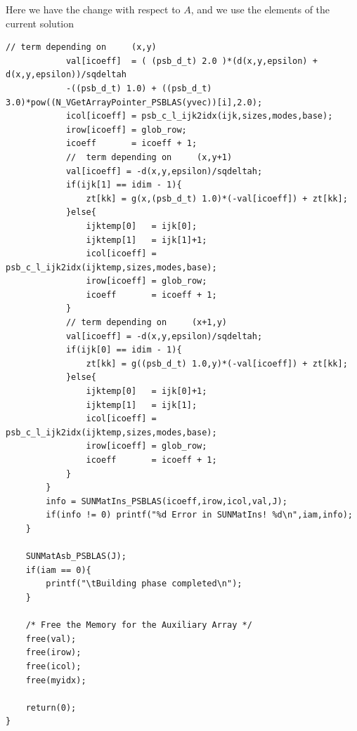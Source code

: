 \documentclass[twoside,a4paper]{refart}
\theoremstyle{definition}
\begin{document}
Here we have the change with respect to $A$, and we use the elements of the current solution
\begin{lstlisting}[style=CStyle]
			// term depending on     (x,y)
			val[icoeff]  = ( (psb_d_t) 2.0 )*(d(x,y,epsilon) + d(x,y,epsilon))/sqdeltah
			-((psb_d_t) 1.0) + ((psb_d_t) 3.0)*pow((N_VGetArrayPointer_PSBLAS(yvec))[i],2.0);
			icol[icoeff] = psb_c_l_ijk2idx(ijk,sizes,modes,base);
			irow[icoeff] = glob_row;
			icoeff       = icoeff + 1;
			//  term depending on     (x,y+1)
			val[icoeff] = -d(x,y,epsilon)/sqdeltah;
			if(ijk[1] == idim - 1){
				zt[kk] = g(x,(psb_d_t) 1.0)*(-val[icoeff]) + zt[kk];
			}else{
				ijktemp[0]   = ijk[0];
				ijktemp[1]   = ijk[1]+1;
				icol[icoeff] = psb_c_l_ijk2idx(ijktemp,sizes,modes,base);
				irow[icoeff] = glob_row;
				icoeff       = icoeff + 1;
			}
			// term depending on     (x+1,y)
			val[icoeff] = -d(x,y,epsilon)/sqdeltah;
			if(ijk[0] == idim - 1){
				zt[kk] = g((psb_d_t) 1.0,y)*(-val[icoeff]) + zt[kk];
			}else{
				ijktemp[0]   = ijk[0]+1;
				ijktemp[1]   = ijk[1];
				icol[icoeff] = psb_c_l_ijk2idx(ijktemp,sizes,modes,base);
				irow[icoeff] = glob_row;
				icoeff       = icoeff + 1;
			}
		}
		info = SUNMatIns_PSBLAS(icoeff,irow,icol,val,J);
		if(info != 0) printf("%d Error in SUNMatIns! %d\n",iam,info);
	}
	
	SUNMatAsb_PSBLAS(J);
	if(iam == 0){
		printf("\tBuilding phase completed\n");
	}
	
	/* Free the Memory for the Auxiliary Array */
	free(val);
	free(irow);
	free(icol);
	free(myidx);
	
	return(0);
}
\end{lstlisting}
\end{document}
